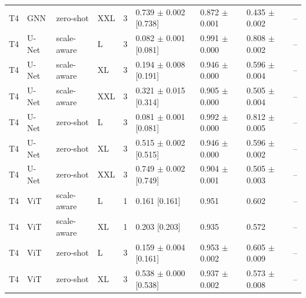 \begin{table}[tb]
\begin{tabular}{lllllllll}
T4 & GNN & zero-shot & XXL & 3 & 0.739 $\pm$ 0.002 [0.738] & 0.872 $\pm$ 0.001 & 0.435 $\pm$ 0.002 & -- \\
T4 & U-Net & scale-aware & L & 3 & 0.082 $\pm$ 0.001 [0.081] & 0.991 $\pm$ 0.000 & 0.808 $\pm$ 0.002 & -- \\
T4 & U-Net & scale-aware & XL & 3 & 0.194 $\pm$ 0.008 [0.191] & 0.946 $\pm$ 0.000 & 0.596 $\pm$ 0.004 & -- \\
T4 & U-Net & scale-aware & XXL & 3 & 0.321 $\pm$ 0.015 [0.314] & 0.905 $\pm$ 0.000 & 0.505 $\pm$ 0.004 & -- \\
T4 & U-Net & zero-shot & L & 3 & 0.081 $\pm$ 0.001 [0.081] & 0.992 $\pm$ 0.000 & 0.812 $\pm$ 0.005 & -- \\
T4 & U-Net & zero-shot & XL & 3 & 0.515 $\pm$ 0.002 [0.515] & 0.946 $\pm$ 0.000 & 0.596 $\pm$ 0.002 & -- \\
T4 & U-Net & zero-shot & XXL & 3 & 0.749 $\pm$ 0.002 [0.749] & 0.904 $\pm$ 0.001 & 0.505 $\pm$ 0.003 & -- \\
T4 & ViT & scale-aware & L & 1 & 0.161 [0.161] & 0.951 & 0.602 & -- \\
T4 & ViT & scale-aware & XL & 1 & 0.203 [0.203] & 0.935 & 0.572 & -- \\
T4 & ViT & zero-shot & L & 3 & 0.159 $\pm$ 0.004 [0.161] & 0.953 $\pm$ 0.002 & 0.605 $\pm$ 0.009 & -- \\
T4 & ViT & zero-shot & XL & 3 & 0.538 $\pm$ 0.000 [0.538] & 0.937 $\pm$ 0.002 & 0.573 $\pm$ 0.008 & -- \\
\bottomrule
\end{tabular}
\end{table}

